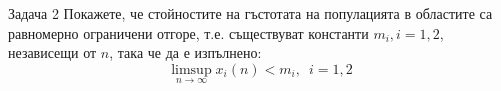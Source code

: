 \begin{frame}[t]{Задача 2}
  Покажете, че стойностите на гъстотата на популацията в областите са равномерно ограничени отгоре, т.е. съществуват константи $m_{i}, i = 1, 2$, независещи
  от $n$, така че да е изпълнено:
  \[
    \limsup\limits_{n \to \infty}x_{i}(n)<m_{i}, \enspace i=1,2
  \]
\end{frame}
